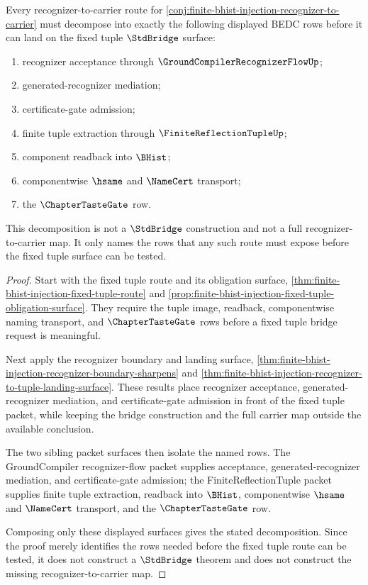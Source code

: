 \begin{theorem}
\label{thm:finite-bhist-injection-recognizer-carrier-map-decomposition}
Every recognizer-to-carrier route for \autoref{conj:finite-bhist-injection-recognizer-to-carrier} must decompose into exactly the following displayed BEDC rows before it can land on the fixed tuple $\StdBridge$ surface:
\begin{enumerate}
  \item recognizer acceptance through $\GroundCompilerRecognizerFlowUp$;
  \item generated-recognizer mediation;
  \item certificate-gate admission;
  \item finite tuple extraction through $\FiniteReflectionTupleUp$;
  \item component readback into $\BHist$;
  \item componentwise $\hsame$ and $\NameCert$ transport;
  \item the $\ChapterTasteGate$ row.
\end{enumerate}
This decomposition is not a $\StdBridge$ construction and not a full recognizer-to-carrier map. It only names the rows that any such route must expose before the fixed tuple surface can be tested.
\end{theorem}
\begin{proof}
Start with the fixed tuple route and its obligation surface, \autoref{thm:finite-bhist-injection-fixed-tuple-route} and \autoref{prop:finite-bhist-injection-fixed-tuple-obligation-surface}. They require the tuple image, readback, componentwise naming transport, and $\ChapterTasteGate$ rows before a fixed tuple bridge request is meaningful.

Next apply the recognizer boundary and landing surface, \autoref{thm:finite-bhist-injection-recognizer-boundary-sharpens} and \autoref{thm:finite-bhist-injection-recognizer-to-tuple-landing-surface}. These results place recognizer acceptance, generated-recognizer mediation, and certificate-gate admission in front of the fixed tuple packet, while keeping the bridge construction and the full carrier map outside the available conclusion.

The two sibling packet surfaces then isolate the named rows. The GroundCompiler recognizer-flow packet supplies acceptance, generated-recognizer mediation, and certificate-gate admission; the FiniteReflectionTuple packet supplies finite tuple extraction, readback into $\BHist$, componentwise $\hsame$ and $\NameCert$ transport, and the $\ChapterTasteGate$ row.

Composing only these displayed surfaces gives the stated decomposition. Since the proof merely identifies the rows needed before the fixed tuple route can be tested, it does not construct a $\StdBridge$ theorem and does not construct the missing recognizer-to-carrier map.
\end{proof}

